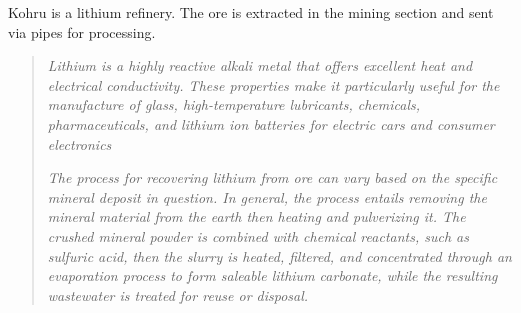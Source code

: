 \begin{rpg-commentbox}{}

\end{rpg-commentbox}

Kohru is a lithium refinery. The ore is extracted in the mining section and sent via pipes for processing. 



\begin{quotation}
\begin{small}
\textit{Lithium is a highly reactive alkali metal that offers excellent heat and electrical conductivity.  These properties make it particularly useful for the manufacture of glass, high-temperature lubricants, chemicals, pharmaceuticals, and lithium ion batteries for electric cars and consumer electronics}

\textit{The process for recovering lithium from ore can vary based on the specific mineral deposit in question. In general, the process entails removing the mineral material from the earth then heating and pulverizing it. The crushed mineral powder is combined with chemical reactants, such as sulfuric acid, then the slurry is heated, filtered, and concentrated through an evaporation process to form saleable lithium carbonate, while the resulting wastewater is treated for reuse or disposal.    }    
\end{small}    
\end{quotation}

